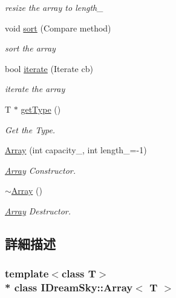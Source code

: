 \begin{DoxyCompactItemize}
\begin{DoxyCompactList}\small\item\em resize the array to length\+\_\+ \end{DoxyCompactList}\item 
void \hyperlink{class_i_dream_sky_1_1_array_a319c1f9b5305d741dc63f1d0cb03d14d}{sort} (Compare method)
\begin{DoxyCompactList}\small\item\em sort the array \end{DoxyCompactList}\item 
bool \hyperlink{class_i_dream_sky_1_1_array_af936901a151b84d43772bc7fdb351079}{iterate} (Iterate cb)
\begin{DoxyCompactList}\small\item\em iterate the array \end{DoxyCompactList}\item 
T $\ast$ \hyperlink{class_i_dream_sky_1_1_array_a73edb951e7796194048b50bbb584063f}{get\+Type} ()
\begin{DoxyCompactList}\small\item\em Get the Type. \end{DoxyCompactList}\item 
\hyperlink{class_i_dream_sky_1_1_array_a06a09394ebafc1d9317a091e9461d0f1}{Array} (int capacity\+\_\+, int length\+\_\+=-\/1)
\begin{DoxyCompactList}\small\item\em \hyperlink{class_i_dream_sky_1_1_array}{Array} Constructor. \end{DoxyCompactList}\item 
\hyperlink{class_i_dream_sky_1_1_array_a5e62c2891a661398bee735b0184f723a}{$\sim$\+Array} ()
\begin{DoxyCompactList}\small\item\em \hyperlink{class_i_dream_sky_1_1_array}{Array} Destructor. \end{DoxyCompactList}\end{DoxyCompactItemize}


\subsection{詳細描述}
\subsubsection*{template$<$class T$>$\\*
class I\+Dream\+Sky\+::\+Array$<$ T $>$}

